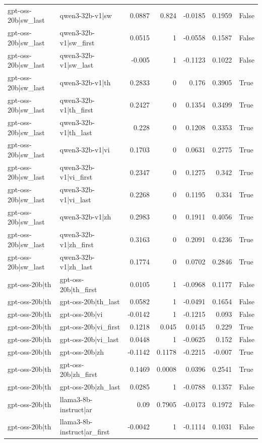 \begin{table}
\begin{tabular}{l l r r r r l}
gpt-oss-20b|sw_last & qwen3-32b-v1|sw & 0.0887 & 0.824 & -0.0185 & 0.1959 & False \\
gpt-oss-20b|sw_last & qwen3-32b-v1|sw_first & 0.0515 & 1 & -0.0558 & 0.1587 & False \\
gpt-oss-20b|sw_last & qwen3-32b-v1|sw_last & -0.005 & 1 & -0.1123 & 0.1022 & False \\
gpt-oss-20b|sw_last & qwen3-32b-v1|th & 0.2833 & 0 & 0.176 & 0.3905 & True \\
gpt-oss-20b|sw_last & qwen3-32b-v1|th_first & 0.2427 & 0 & 0.1354 & 0.3499 & True \\
gpt-oss-20b|sw_last & qwen3-32b-v1|th_last & 0.228 & 0 & 0.1208 & 0.3353 & True \\
gpt-oss-20b|sw_last & qwen3-32b-v1|vi & 0.1703 & 0 & 0.0631 & 0.2775 & True \\
gpt-oss-20b|sw_last & qwen3-32b-v1|vi_first & 0.2347 & 0 & 0.1275 & 0.342 & True \\
gpt-oss-20b|sw_last & qwen3-32b-v1|vi_last & 0.2268 & 0 & 0.1195 & 0.334 & True \\
gpt-oss-20b|sw_last & qwen3-32b-v1|zh & 0.2983 & 0 & 0.1911 & 0.4056 & True \\
gpt-oss-20b|sw_last & qwen3-32b-v1|zh_first & 0.3163 & 0 & 0.2091 & 0.4236 & True \\
gpt-oss-20b|sw_last & qwen3-32b-v1|zh_last & 0.1774 & 0 & 0.0702 & 0.2846 & True \\
gpt-oss-20b|th & gpt-oss-20b|th_first & 0.0105 & 1 & -0.0968 & 0.1177 & False \\
gpt-oss-20b|th & gpt-oss-20b|th_last & 0.0582 & 1 & -0.0491 & 0.1654 & False \\
gpt-oss-20b|th & gpt-oss-20b|vi & -0.0142 & 1 & -0.1215 & 0.093 & False \\
gpt-oss-20b|th & gpt-oss-20b|vi_first & 0.1218 & 0.045 & 0.0145 & 0.229 & True \\
gpt-oss-20b|th & gpt-oss-20b|vi_last & 0.0448 & 1 & -0.0625 & 0.152 & False \\
gpt-oss-20b|th & gpt-oss-20b|zh & -0.1142 & 0.1178 & -0.2215 & -0.007 & True \\
gpt-oss-20b|th & gpt-oss-20b|zh_first & 0.1469 & 0.0008 & 0.0396 & 0.2541 & True \\
gpt-oss-20b|th & gpt-oss-20b|zh_last & 0.0285 & 1 & -0.0788 & 0.1357 & False \\
gpt-oss-20b|th & llama3-8b-instruct|ar & 0.09 & 0.7905 & -0.0173 & 0.1972 & False \\
gpt-oss-20b|th & llama3-8b-instruct|ar_first & -0.0042 & 1 & -0.1114 & 0.1031 & False \\

\end{tabular}
\end{table}
